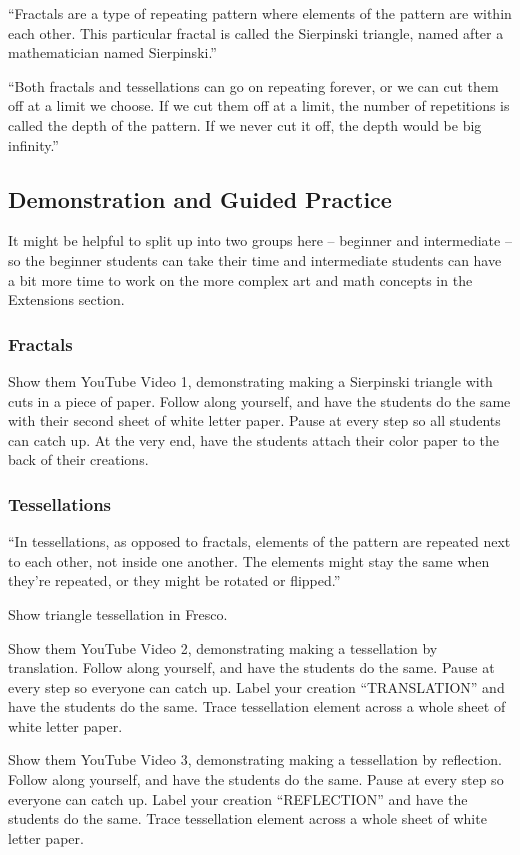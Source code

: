 \documentclass{lessonplan}
\begin{document}
        ``Fractals are a type of repeating pattern where elements of the pattern are within each other. This particular 
        fractal is called the Sierpinski triangle, named after a mathematician named Sierpinski.''

        ``Both fractals and tessellations can go on repeating forever, or we can cut them off at a limit we choose. If 
        we cut them off at a limit, the number of repetitions is called the depth of the pattern. If we never cut it 
        off, the depth would be big infinity.''
    \subsection{Demonstration and Guided Practice}
      It might be helpful to split up into two groups here -- beginner and intermediate -- so the beginner students can
      take their time and intermediate students can have a bit more time to work on the more complex art and math 
      concepts in the Extensions section.
      \subsubsection{Fractals}
        Show them YouTube Video 1, demonstrating making a Sierpinski triangle with cuts in a piece of paper.
        Follow along yourself, and have the students do the same with their second sheet of white letter paper. Pause at 
        every step so all students can catch up. At the very end, have the students attach their color paper to the back 
        of their creations.
      \subsubsection{Tessellations}
        ``In tessellations, as opposed to fractals, elements of the pattern are repeated next to each other, not inside 
        one another. The elements might stay the same when they're repeated, or they might be rotated or flipped.''
      
        Show triangle tessellation in Fresco.
      
        Show them YouTube Video 2, demonstrating making a tessellation by translation. Follow along yourself, and have 
        the students do the same. Pause at every step so everyone can catch up. Label your creation ``TRANSLATION'' and 
        have the students do the same. Trace tessellation element across a whole sheet of white letter paper.

        Show them YouTube Video 3, demonstrating making a tessellation by reflection. Follow along yourself, and have 
        the students do the same. Pause at every step so everyone can catch up. Label your creation ``REFLECTION'' and 
        have the students do the same. Trace tessellation element across a whole sheet of white letter paper.
\end{document}
